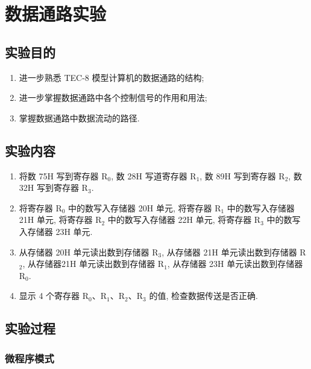 \documentclass[../main.tex]{subfiles}
\begin{document}
\setcounter{chapter}{2}

\chapter{数据通路实验}

\section{实验目的}

\begin{enumerate}

    \item 进一步熟悉 TEC-8 模型计算机的数据通路的结构;
    \item 进一步掌握数据通路中各个控制信号的作用和用法;
    \item 掌握数据通路中数据流动的路径.

\end{enumerate}

\section{实验内容}

\begin{enumerate}

    \item 将数 75H 写到寄存器 R$_0$, 数 28H 写道寄存器 R$_1$, 数 89H 写到寄存器 R$_2$, 数 32H 写到寄存器 R$_3$.
    \item 将寄存器 R$_0$ 中的数写入存储器 20H 单元, 将寄存器 R$_1$ 中的数写入存储器 21H 单元, 将寄存器 R$_2$ 中的数写入存储器 22H 单元, 将寄存器 R$_3$ 中的数写入存储器 23H 单元.
    \item 从存储器 20H 单元读出数到存储器 R$_3$, 从存储器 21H 单元读出数到存储器 R$_2$, 从存储器21H 单元读出数到存储器 R$_1$, 从存储器 23H 单元读出数到存储器 R$_0$.
    \item 显示 4 个寄存器 R$_0$、R$_1$、R$_2$、R$_3$ 的值, 检查数据传送是否正确.

\end{enumerate}

\section{实验过程}

\subsection{微程序模式}
\end{document}

